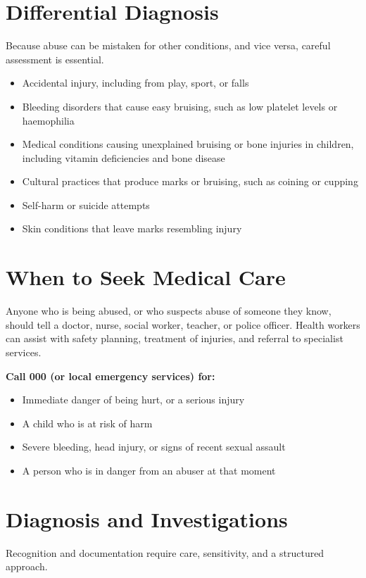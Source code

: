 \section*{Differential Diagnosis}
Because abuse can be mistaken for other conditions, and vice versa, careful assessment is essential.

\begin{itemize}
    \item Accidental injury, including from play, sport, or falls
    \item Bleeding disorders that cause easy bruising, such as low platelet levels or haemophilia
    \item Medical conditions causing unexplained bruising or bone injuries in children, including vitamin deficiencies and bone disease
    \item Cultural practices that produce marks or bruising, such as coining or cupping
    \item Self-harm or suicide attempts
    \item Skin conditions that leave marks resembling injury
\end{itemize}

\section*{When to Seek Medical Care}
Anyone who is being abused, or who suspects abuse of someone they know, should tell a doctor, nurse, social worker, teacher, or police officer. Health workers can assist with safety planning, treatment of injuries, and referral to specialist services.

\textbf{Call 000 (or local emergency services) for:}
\begin{itemize}
    \item Immediate danger of being hurt, or a serious injury
    \item A child who is at risk of harm
    \item Severe bleeding, head injury, or signs of recent sexual assault
    \item A person who is in danger from an abuser at that moment
\end{itemize}

\section*{Diagnosis and Investigations}
Recognition and documentation require care, sensitivity, and a structured approach.

